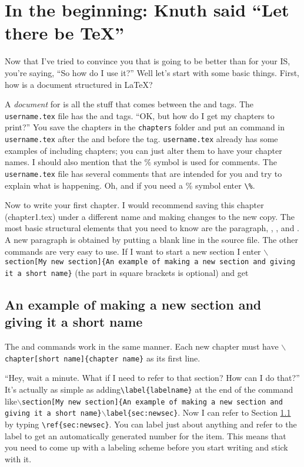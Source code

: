 \chapter{In the beginning: Knuth said ``Let there be \TeX''}\label{text}
Now that I've tried to convince you that \lt is going to be better than \msw for your IS, you're saying, ``So how do I use it?'' Well let's start with some basic things. First, how is a document structured in \LaTeX?

A \emph{document} for \lt is all the stuff that comes between the \verb|| and \verb|| tags. The\verb| username.tex| file has the \verb|| and \verb|| tags. ``OK, but how do I get my chapters to print?'' You save the chapters in the \verb|chapters| folder and put an \verb|| command in \verb|username.tex| after the \verb|| and before the
\verb|| tag. \verb|username.tex| already has some examples of including chapters; you can just alter them to have your chapter names. I should also mention that the \% symbol is used for comments. The \verb|username.tex| file has several comments that are intended for you and try to explain what is happening. Oh, and if you need a \% symbol enter \verb+\%+.

Now to write your first chapter. I would recommend saving this chapter (chapter1.tex) under a different name and making changes to the new copy. The most basic structural elements that you need to know are the paragraph, , , and . A new paragraph is obtained by putting a blank line in the source file.  The other commands are very easy to use. If I want to start a new section I enter \texttt{$\backslash$section[My new section]\{An example of making a new section and giving it a short name\}} (the part in square brackets is optional) and get

\section[My new section]{An example of making a new section and giving it a short name}\label{sec:newsec}

The  and  commands work in the same manner. Each new chapter must have \texttt{$\backslash$chapter[short name]\{chapter name\}} as its first line.

``Hey, wait a minute. What if I need to refer to that section? How can I do that?'' It's actually as simple as adding\verb+\label{labelname}+ at the end of the  command like\texttt{$\backslash$section[My new section]\{An example of making a new section and giving it a short name\}$\backslash$label\{sec:newsec\}}. Now I can refer to Section \ref{sec:newsec} by typing \verb+\ref{sec:newsec}+. You can label just about anything and refer to the label to get an automatically generated number for the item. This means that you need to come up with a labeling scheme before you start writing and stick with it.

